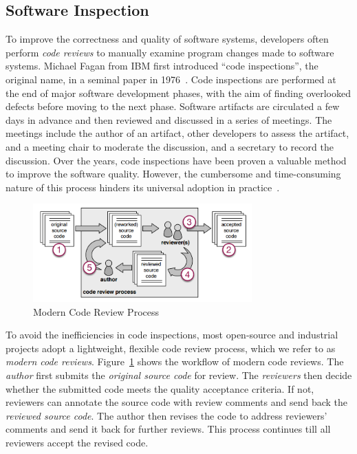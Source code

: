 \documentclass[runningheads,a4paper]{llncs}
\begin{document}
\subsection{Software Inspection} 
To improve the correctness and quality of software systems, developers often perform {\em code reviews} to manually examine program changes made to software systems. Michael Fagan from IBM first introduced ``code inspections'', the original name, in a seminal paper in 1976~\cite{Fagan1999:checklist}. Code inspections are performed at the end of major software development phases, with the aim of finding overlooked defects before moving to the next phase. Software artifacts are circulated a few days in advance and then reviewed and discussed in a series of meetings. The meetings include the author of an artifact, other developers to assess the artifact, and a meeting chair to moderate the discussion, and a secretary to record the discussion. Over the years, code inspections have been proven a valuable method to improve the software quality. However, the cumbersome and time-consuming nature of this process hinders its universal adoption in practice~\cite{johnson1998reengineering}. 

\begin{figure}[ht]
 \centering
 \includegraphics[width=0.75\textwidth]{images/review-process.png}
 \caption{Modern Code Review Process~\cite{beller2014modern}}
 \label{fig:review-process}
\end{figure}

To avoid the inefficiencies in code inspections, most open-source and industrial projects adopt a lightweight, flexible code review process, which we refer to as {\em modern code reviews}. Figure~\ref{fig:review-process} shows the workflow of modern code reviews. The {\em author} first submits the {\em original source code} for review. The {\em reviewers} then decide whether the submitted code meets the quality acceptance criteria. If not, reviewers can annotate the source code with review comments and send back the {\em reviewed source code}. The author then revises the code to address reviewers' comments and send it back for further reviews. This process continues till all reviewers accept the revised code.
\end{document}
